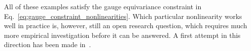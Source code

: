 All of these examples satisfy the gauge equivariance constraint in Eq.~\eqref{eq:gauge_constraint_nonlinearities}.
Which particular nonlinearity works well in practice is, however, still an open research question, which requires much more empirical investigation before it can be answered.
A first attempt in this direction has been made in~\cite{Weiler2019_E2CNN}.
